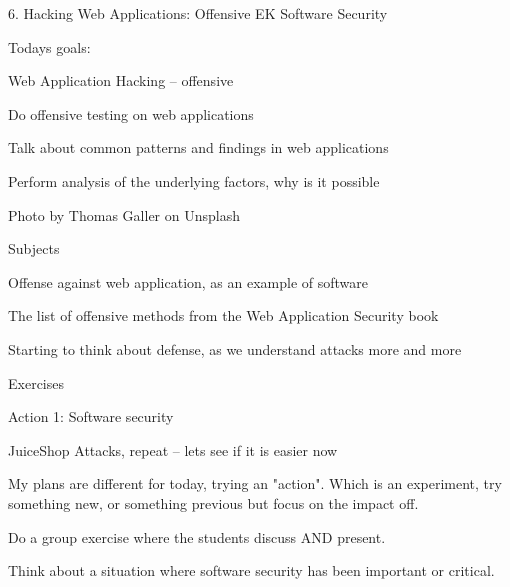 \documentclass[Screen16to9,17pt]{foils}
\begin{document}
\mytitlepage
{6. Hacking Web Applications: Offensive}
{EK  Software Security}




Todays goals:
\begin{list2}
\item Web Application Hacking -- offensive
\item Do offensive testing on web applications
\item Talk about common patterns and findings in web applications
\item Perform analysis of the underlying factors, why is it possible
\end{list2}

Photo by Thomas Galler on Unsplash




\begin{list1}
\item Subjects
\begin{list2}
\item Offense against web application, as an example of software
\item The list of offensive methods from the Web Application Security book
\item Starting to think about defense, as we understand attacks more and more
\end{list2}
\item Exercises
\begin{list2}
\item Action 1: Software security
\item JuiceShop Attacks, repeat -- lets see if it is easier now
\end{list2}
\end{list1}

My plans are different for today, trying an "action". Which is an experiment,
try something new, or something previous but focus on the impact off.


Do a group exercise where the students discuss AND present.

Think about a situation where software security has been important or critical.
\end{document}
